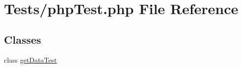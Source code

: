 \hypertarget{phpTest_8php}{}\section{Tests/php\+Test.php File Reference}
\label{phpTest_8php}
\subsection*{Classes}
\begin{DoxyCompactItemize}
\item 
class \hyperlink{classgetDataTest}{get\+Data\+Test}
\end{DoxyCompactItemize}
